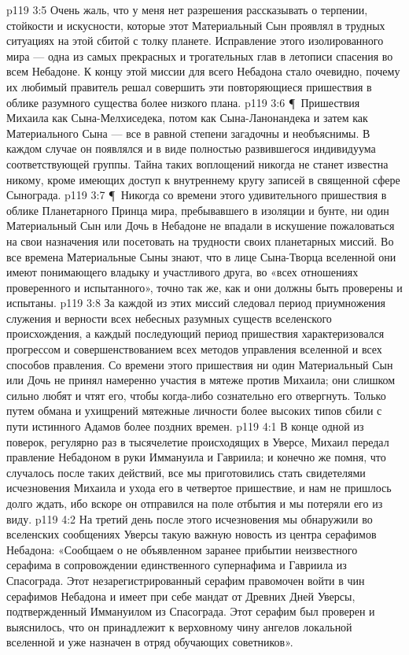 \vs p119 3:5 Очень жаль, что у меня нет разрешения рассказывать о терпении, стойкости и искусности, которые этот Материальный Сын проявлял в трудных ситуациях на этой сбитой с толку планете. Исправление этого изолированного мира --- одна из самых прекрасных и трогательных глав в летописи спасения во всем Небадоне. К концу этой миссии для всего Небадона стало очевидно, почему их любимый правитель решал совершить эти повторяющиеся пришествия в облике разумного существа более низкого плана.
\vs p119 3:6 \P\ Пришествия Михаила как Сына\hyp{}Мелхиседека, потом как Сына\hyp{}Ланонандека и затем как Материального Сына --- все в равной степени загадочны и необъяснимы. В каждом случае он появлялся  и в виде полностью развившегося индивидуума соответствующей группы. Тайна таких воплощений никогда не станет известна никому, кроме имеющих доступ к внутреннему кругу записей в священной сфере Сынограда.
\vs p119 3:7 \P\ Никогда со времени этого удивительного пришествия в облике Планетарного Принца мира, пребывавшего в изоляции и бунте, ни один Материальный Сын или Дочь в Небадоне не впадали в искушение пожаловаться на свои назначения или посетовать на трудности своих планетарных миссий. Во все времена Материальные Сыны знают, что в лице Сына\hyp{}Творца вселенной они имеют понимающего владыку и участливого друга, во «всех отношениях проверенного и испытанного», точно так же, как и они должны быть проверены и испытаны.
\vs p119 3:8 За каждой из этих миссий следовал период приумножения служения и верности всех небесных разумных существ вселенского происхождения, а каждый последующий период пришествия характеризовался прогрессом и совершенствованием всех методов управления вселенной и всех способов правления. Со времени этого пришествия ни один Материальный Сын или Дочь не принял намеренно участия в мятеже против Михаила; они слишком сильно любят и чтят его, чтобы когда\hyp{}либо сознательно его отвергнуть. Только путем обмана и ухищрений мятежные личности более высоких типов сбили с пути истинного Адамов более поздних времен.
\vs p119 4:1 В конце одной из поверок, регулярно раз в тысячелетие происходящих в Уверсе, Михаил передал правление Небадоном в руки Иммануила и Гавриила; и конечно же помня, что случалось после таких действий, все мы приготовились стать свидетелями исчезновения Михаила и ухода его в четвертое пришествие, и нам не пришлось долго ждать, ибо вскоре он отправился на поле отбытия и мы потеряли его из виду.
\vs p119 4:2 На третий день после этого исчезновения мы обнаружили во вселенских сообщениях Уверсы такую важную новость из центра серафимов Небадона: «Сообщаем о не объявленном заранее прибытии неизвестного серафима в сопровождении единственного супернафима и Гавриила из Спасограда. Этот незарегистрированный серафим правомочен войти в чин серафимов Небадона и имеет при себе мандат от Древних Дней Уверсы, подтвержденный Иммануилом из Спасограда. Этот серафим был проверен и выяснилось, что он принадлежит к верховному чину ангелов локальной вселенной и уже назначен в отряд обучающих советников».

